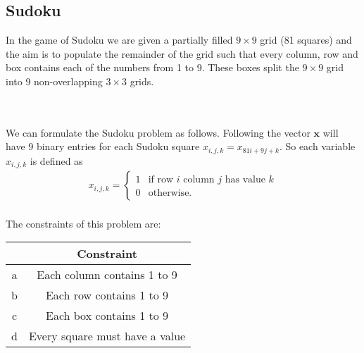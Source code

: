 \documentclass{article}
\begin{document}
\subsection{Sudoku}

In the game of Sudoku we are given a partially filled \(9 \times 9\) grid (81 squares) and the aim is to populate the remainder of the grid such that every column, row and box contains each of the numbers from 1 to 9. These boxes split the \(9 \times 9\) grid into 9 non-overlapping \(3 \times 3\) grids.\\

\hspace{92pt}\begin{lpsudoku}[scale=0.5]
\end{lpsudoku}\\
\\

\noindent We can formulate the Sudoku problem as follows. Following \cite[p.~1]{mücke2024sudoku} the vector \(\mathbf{x}\) will have 9 binary entries for each Sudoku square \(x_{i,j,k} = x_{81i + 9j + k}\). So each variable \(x_{i,j,k}\) is defined as
\begin{align*}
    x_{i,j,k} = \begin{cases}
        1 & \text{if row \(i\) column \(j\) has value \(k\)} \\
        0 & \text{otherwise.}
    \end{cases}
\end{align*}\\

\noindent The constraints of this problem are:
\begin{center}
\begin{tabular}{ |c|c| } 
 \hline
   & Constraint\\ 
 \hline
 a & Each column contains 1 to 9\\ 
 b & Each row contains 1 to 9\\
 c & Each box contains 1 to 9\\
 d & Every square must have a value\\
 \hline
\end{tabular}
\end{center}
\end{document}
